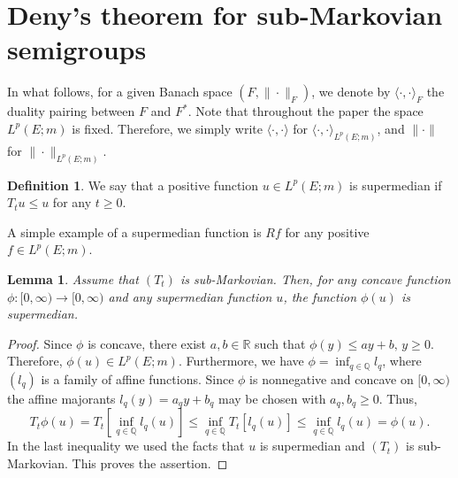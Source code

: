 \documentclass[11pt,a4paper,reqno]{amsart}
\newtheorem{lemma}[theorem]{\bf Lemma}
\theoremstyle{definition}
\newtheorem{definition}[theorem]{Definition}
\numberwithin{equation}{section}
\begin{document}
\section{Deny's theorem for sub-Markovian semigroups}
\label{sec3}
In what follows, for a given Banach space $(F,\|\cdot\|_F)$, we denote by $\langle\cdot,\cdot\rangle_F$ 
the duality pairing between $F$
and $F^*$. Note that throughout the paper the space $L^p(E;m)$ is fixed. Therefore, we simply write 
$\langle\cdot,\cdot\rangle$ for $\langle\cdot,\cdot\rangle_{L^p(E;m)}$, and $\|\cdot\|$ for $\|\cdot\|_{L^p(E;m)}$.

\begin{definition}
We say that a positive function $u\in L^p(E;m)$ is supermedian if $T_tu\le u$
for any $t\ge 0$.
\end{definition}
A simple example of a supermedian function is $Rf$ for any positive $f\in L^p(E;m)$.

\begin{lemma}
\label{lm1}
Assume  that  $(T_t)$ is sub-Markovian. Then, for any  concave function $\phi:[0,\infty)\to [0,\infty)$ 
and any  supermedian function $u$, the function $\phi(u)$ is supermedian.  
\end{lemma}
\begin{proof}
Since $\phi$ is concave,  there exist $a,b\in\mathbb R$ such that $\phi(y)\le ay+b,\, y\ge 0$.
Therefore, $\phi(u)\in L^p(E;m)$. Furthermore, we have $\phi=\inf_{q\in\mathbb Q} l_q$, 
where $(l_q)$ is a family of affine  functions. Since $\phi$ is nonnegative and concave on $[0,\infty)$
the affine majorants $l_q(y)=a_qy+b_q$ may be chosen with $a_q,b_q\ge0$.
Thus,
\[
T_t\phi(u)= T_t[\inf_{q\in\mathbb Q} l_q(u)]\le \inf_{q\in \mathbb Q}T_t[l_q(u)]\le \inf_{q\in \mathbb Q}l_q(u)=\phi(u).
\]
In the last inequality we used the facts that $u$ is supermedian and $(T_t)$ is sub-Markovian. This proves the assertion.
\end{proof}
\end{document}
